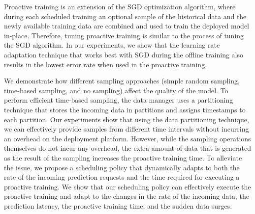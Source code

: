 Proactive training is an extension of the SGD optimization algorithm, where during each scheduled training an optional sample of the historical data and the newly available training data are combined and used to train the deployed model in-place.
Therefore, tuning proactive training is similar to the process of tuning the SGD algorithm.
In our experiments, we show that the learning rate adaptation technique that works best with SGD during the offline training also results in the lowest error rate when used in the proactive training.

We demonstrate how different sampling approaches (simple random sampling, time-based sampling, and no sampling) affect the quality of the model.
To perform efficient time-based sampling, the data manager uses a partitioning technique that stores the incoming data in partitions and assigns timestamps to each partition.
Our experiments show that using the data partitioning technique, we can effectively provide samples from different time intervals without incurring an overhead on the deployment platform.
However, while the sampling operations themselves do not incur any overhead, the extra amount of data that is generated as the result of the sampling increases the proactive training time.
To alleviate the issue, we propose a scheduling policy that dynamically adapts to both the rate of the incoming prediction requests and the time required for executing a proactive training.
We show that our scheduling policy can effectively execute the proactive training and adapt to the changes in the rate of the incoming data, the prediction latency, the proactive training time, and the sudden data surges.





